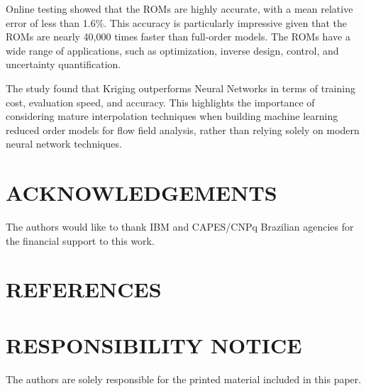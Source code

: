 \documentclass[10pt,fleqn,a4paper,twoside]{article}
\begin{document}
Online testing showed that the ROMs are highly accurate, with a mean relative error of less than 1.6\%. This accuracy is particularly impressive given that the ROMs are nearly 40,000 times faster than full-order models. The ROMs have a wide range of applications, such as optimization, inverse design, control, and uncertainty quantification.

The study found that Kriging outperforms Neural Networks in terms of training cost, evaluation speed, and accuracy. This highlights the importance of considering mature interpolation techniques when building machine learning reduced order models for flow field analysis, rather than relying solely on modern neural network techniques.

\section{ACKNOWLEDGEMENTS}

The authors would like to thank IBM and CAPES/CNPq Brazilian agencies for the financial support to this work.


\section{REFERENCES} 
\label{Sec:references}


\renewcommand{\refname}{}


\section{RESPONSIBILITY NOTICE}

The authors are solely responsible for the printed material included in this paper.
\end{document}
